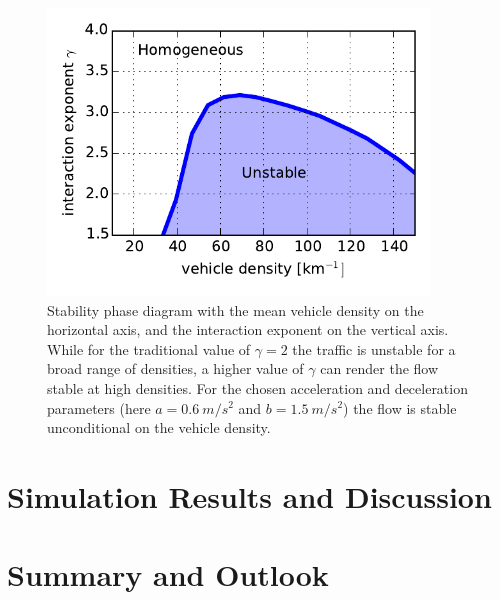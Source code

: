 \begin{figure}
    \centering
    \includegraphics[width=4in]{../img/phase_diagram.pdf}
    \caption{Stability phase diagram with the mean vehicle density on the horizontal axis, and the interaction exponent on the vertical axis. While for the traditional value of $\gamma=2$ the traffic is unstable for a broad range of densities, a higher value of $\gamma$ can render the flow stable at high densities. For the chosen acceleration and deceleration parameters (here $a=\SI{0.6}{m/s^2}$ and $b=\SI{1.5}{m/s^2}$) the flow is stable unconditional on the vehicle density.}
    \label{fig:phase_diagram}
\end{figure}


\section{Simulation Results and Discussion}

\section{Summary and Outlook}










  



 
